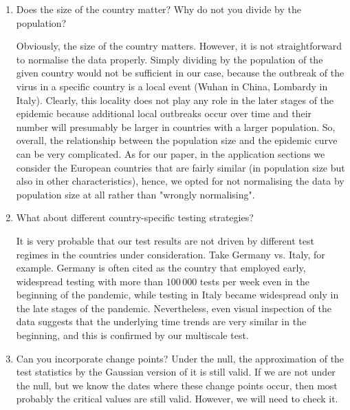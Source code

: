 \documentclass[a4paper,12pt]{article}
\numberwithin{equation}{section}
\begin{document}
\begin{enumerate}
\item Does the size of the country matter? Why do not you divide by the population?
	
	Obviously, the size of the country matters. However, it is not straightforward to normalise the data properly. Simply dividing by the population of the given country would not be sufficient in our case, because the outbreak of the virus in a specific country is a local event (Wuhan in China, Lombardy in Italy). Clearly, this locality does not play any role in the later stages of the epidemic because additional local outbreaks occur over time and their number will presumably be larger in countries with a larger population. So, overall, the relationship between the population size and the epidemic curve can be very complicated. As for our paper, in the application sections we consider the European countries that are fairly similar (in population size but also in other characteristics), hence, we opted for not normalising the data by population size at all rather than "wrongly normalising".
	\item What about different country-specific testing strategies?
	
It is very probable that our test results are not driven by different test regimes in the countries under consideration. Take Germany vs. Italy, for example. Germany is often cited as the country that employed early, widespread testing with more than $100\,000$ tests per week even in the beginning of the pandemic, while testing in Italy became widespread only in the late stages of the pandemic. Nevertheless, even visual inspection of the data suggests that the underlying time trends are very similar in the beginning, and this is confirmed by our multiscale test.
	\item Can you incorporate change points?
	Under the null, the approximation of the test statistics by the Gaussian version of it is still valid. If we are not under the null, but we know the dates where these change points occur, then most probably the critical values are still valid. However, we will need to check it.
\end{enumerate}
\end{document}
